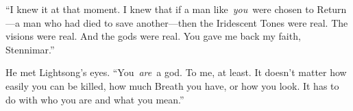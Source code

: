 “I knew it at that moment. I knew that if a man like~\textit{you}~were chosen to Return—a man who had died to save another—then the Iridescent Tones were real. The visions were real. And the gods were real. You gave me back my faith, Stennimar.”

He met Lightsong’s eyes. “You~\textit{are}~a god. To me, at least. It doesn’t matter how easily you can be killed, how much Breath you have, or how you look. It has to do with who you are and what you mean.”


